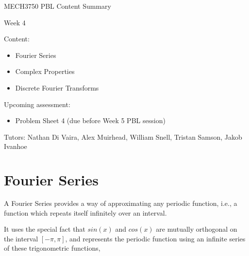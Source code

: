 \documentclass[12pt]{article}
\begin{document}
\begin{center}
{\Huge   MECH3750 PBL Content Summary}

\vspace{6mm}

{\Huge  Week 4}

\end{center}

\vspace{6mm}

{\Large Content:}
{\begin{itemize}
	\item Fourier Series
	\item Complex Properties
	\item Discrete Fourier Transforms
\end{itemize}}

\vspace{4mm}

{\Large Upcoming assessment:}
{\begin{itemize}
	\item Problem Sheet 4 (due before Week 5 PBL session)
\end{itemize}}

\vspace{4mm}

{Tutors: Nathan Di Vaira, Alex Muirhead, William Snell, Tristan Samson, Jakob Ivanhoe}


\pagebreak


\section{Fourier Series}

\vspace{4mm}

A Fourier Series provides a way of approximating any periodic function, i.e., a function which repeats itself infinitely over an interval. 

\vspace{4mm}

It uses the special fact that $sin(x)$ and $cos(x)$ are mutually orthogonal on the interval $[-\pi,\pi]$, and represents the periodic function using an infinite series of these trigonometric functions,
\end{document}
